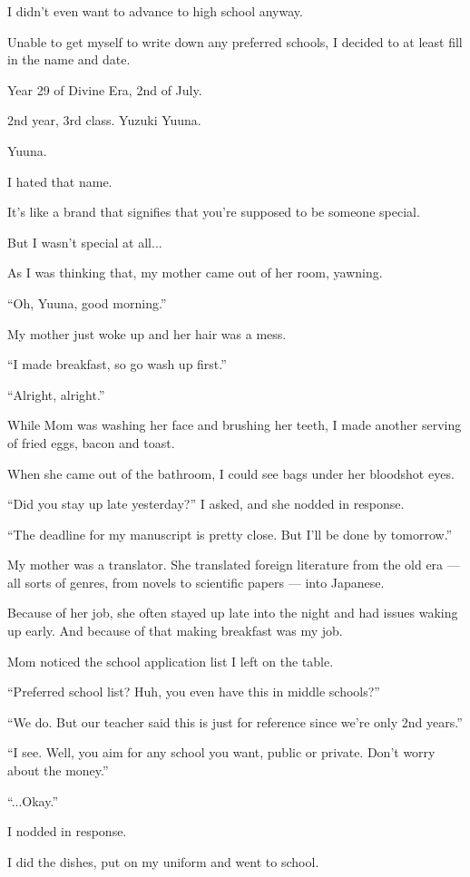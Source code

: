 I didn't even want to advance to high school anyway.

Unable to get myself to write down any preferred schools, I decided to at least fill in the name and date.

Year 29 of Divine Era, 2nd of July.

2nd year, 3rd class. Yuzuki Yuuna.


Yuuna.


I hated that name.

It's like a brand that signifies that you're supposed to be someone special.

But I wasn't special at all...

As I was thinking that, my mother came out of her room, yawning.

``Oh, Yuuna, good morning.''

My mother just woke up and her hair was a mess.

``I made breakfast, so go wash up first.''

``Alright, alright.''

While Mom was washing her face and brushing her teeth, I made another serving of fried eggs, bacon and toast.

When she came out of the bathroom, I could see bags under her bloodshot eyes.

``Did you stay up late yesterday?'' I asked, and she nodded in response.

``The deadline for my manuscript is pretty close. But I'll be done by tomorrow.''

My mother was a translator. She translated foreign literature from the old era --- all sorts of genres, from novels to scientific papers --- into Japanese.

Because of her job, she often stayed up late into the night and had issues waking up early. And because of that making breakfast was my job.

Mom noticed the school application list I left on the table.

``Preferred school list? Huh, you even have this in middle schools?''

``We do. But our teacher said this is just for reference since we're only 2nd years.''

``I see. Well, you aim for any school you want, public or private. Don't worry about the money.''

``...Okay.''

I nodded in response.

I did the dishes, put on my uniform and went to school.

